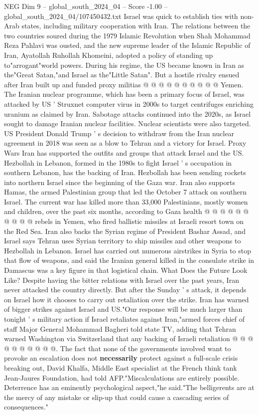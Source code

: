 \begin{textsample}{NEG Dim 9 – global\_south\_2024\_04 – Score -1.00 – global\_south\_2024\_04/107450432.txt}
Israel was quick to establish ties with non-Arab states, including military cooperation with Iran.
The relations between the two countries soured during the 1979 Islamic Revolution when Shah Mohammad Reza Pahlavi was ousted, and the new supreme leader of the Islamic Republic of Iran, Ayatollah Ruhollah Khomeini, adopted a policy of standing up to"arrogant"world powers.
During his regime, the US became known in Iran as the"Great Satan,"and Israel as the"Little Satan".
But a hostile rivalry ensued after Iran built up and funded proxy militias @ @ @ @ @ @ @ @ @ @ Yemen.
The Iranian nuclear programme, which has been a primary focus of Israel, was attacked by US ' Struxnet computer virus in 2000s to target centrifuges enriching uranium as claimed by Iran.
Sabotage attacks continued into the 2020s, as Israel sought to damage Iranian nuclear facilities.
Nuclear scientists were also targeted.
US President Donald Trump ' s decision to withdraw from the Iran nuclear agreement in 2018 was seen as a blow to Tehran and a victory for Israel.
Proxy Wars Iran has supported the outfits and groups that attack Israel and the US.
Hezbollah in Lebanon, formed in the 1980s to fight Israel ' s occupation in southern Lebanon, has the backing of Iran.
Hezbollah has been sending rockets into northern Israel since the beginning of the Gaza war.
Iran also supports Hamas, the armed Palestinian group that led the October 7 attack on southern Israel.
The current war has killed more than 33,000 Palestinians, mostly women and children, over the past six months, according to Gaza health @ @ @ @ @ @ @ @ @ @ rebels in Yemen, who fired ballistic missiles at Israeli resort town on the Red Sea.
Iran also backs the Syrian regime of President Bashar Assad, and Israel says Tehran uses Syrian territory to ship missiles and other weapons to Hezbollah in Lebanon.
Israel has carried out numerous airstrikes in Syria to stop that flow of weapons, and said the Iranian general killed in the consulate strike in Damascus was a key figure in that logistical chain.
What Does the Future Look Like?
Despite having the bitter relations with Israel over the past years, Iran never attacked the country directly.
But after the Sunday ' s attack, it depends on Israel how it chooses to carry out retaliation over the strike.
Iran has warned of bigger strikes against Israel and US."Our response will be much larger than tonight ' s military action if Israel retaliates against Iran,"armed forces chief of staff Major General Mohammad Bagheri told state TV, adding that Tehran warned Washington via Switzerland that any backing of Israeli retaliation @ @ @ @ @ @ @ @ @ @.
The fact that none of the governments involved want to provoke an escalation does not \textbf{necessarily} protect against a full-scale crisis breaking out, David Khalfa, Middle East specialist at the French think tank Jean-Jaures Foundation, had told AFP."Miscalculations are entirely possible.
Deterrence has an eminently psychological aspect,"he said."The belligerents are at the mercy of any mistake or slip-up that could cause a cascading series of consequences."

\end{textsample}
